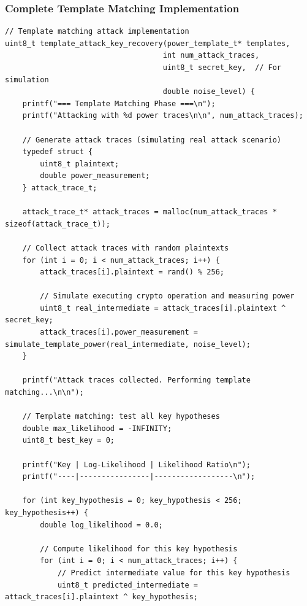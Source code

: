 \documentclass[11pt,a4paper]{article}
\theoremstyle{definition}
\begin{document}
\subsubsection{Complete Template Matching Implementation}

\begin{lstlisting}[caption={Template Attack Key Recovery Implementation}]
// Template matching attack implementation
uint8_t template_attack_key_recovery(power_template_t* templates, 
                                    int num_attack_traces, 
                                    uint8_t secret_key,  // For simulation
                                    double noise_level) {
    printf("=== Template Matching Phase ===\n");
    printf("Attacking with %d power traces\n\n", num_attack_traces);
    
    // Generate attack traces (simulating real attack scenario)
    typedef struct {
        uint8_t plaintext;
        double power_measurement;
    } attack_trace_t;
    
    attack_trace_t* attack_traces = malloc(num_attack_traces * sizeof(attack_trace_t));
    
    // Collect attack traces with random plaintexts
    for (int i = 0; i < num_attack_traces; i++) {
        attack_traces[i].plaintext = rand() % 256;
        
        // Simulate executing crypto operation and measuring power
        uint8_t real_intermediate = attack_traces[i].plaintext ^ secret_key;
        attack_traces[i].power_measurement = simulate_template_power(real_intermediate, noise_level);
    }
    
    printf("Attack traces collected. Performing template matching...\n\n");
    
    // Template matching: test all key hypotheses
    double max_likelihood = -INFINITY;
    uint8_t best_key = 0;
    
    printf("Key | Log-Likelihood | Likelihood Ratio\n");
    printf("----|----------------|------------------\n");
    
    for (int key_hypothesis = 0; key_hypothesis < 256; key_hypothesis++) {
        double log_likelihood = 0.0;
        
        // Compute likelihood for this key hypothesis
        for (int i = 0; i < num_attack_traces; i++) {
            // Predict intermediate value for this key hypothesis
            uint8_t predicted_intermediate = attack_traces[i].plaintext ^ key_hypothesis;
            

\end{lstlisting}
\end{document}
